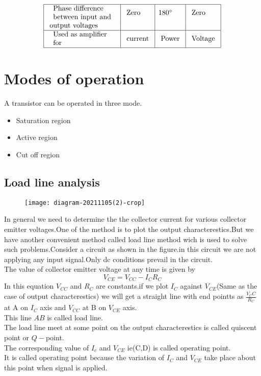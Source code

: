 $$\begin{aligned}
\begin{array}{|l|l|l|l|}
  		\hline \begin{array}{l}
  			\text { Phase difference } \\
  			\text { between input and }
  		\end{array} & \text { Zero } & 180^{\circ} & \text { Zero } \\
  		\text { output voltages } & & & \\
  		\hline \begin{array}{l}
  			\text { Used as amplifier } \\
  			\text { for }
  		\end{array} & \text { current } & \text { Power } & \text { Voltage } \\
  		\hline
  	\end{array}
  \end{aligned}$$
 \section{Modes of operation}
 A transistor can be operated in three mode.
 \begin{itemize}
 	\item Saturation region
 	\item Active region
 	\item Cut off region
 	 \end{itemize}
 	\subsection{Load line analysis}
 	\begin{figure}[H]
 		\centering
 		\texttt{[image: diagram-20211105(2)-crop]}
 		\caption{}
 		\label{}
 	\end{figure}
 	In general we need to determine the the collector current for various collector emitter voltages.One of the method is to plot the output characterestics.But we have another convenient method called load line method wich is used to solve such problems.Consider a circuit as shown in the figure.in this circuit we are not applying any input signal.Only dc conditions prevail in the circuit.\\
 	The value of collector emitter voltage at any time is given by\\
 	$$V_{CE}=V_{CC}-I_CR_C$$
 	In this equation $V_{CC}$ and $R_C$ are constants.if we plot $I_C$ against $V_{CE}$(Same as the case of output characterestics) we will get a straight line with end pointts as $\frac{V_CC}{R_C}$ at A on $I_C$ axis and $V_{CC}$ at B on $V_{CE}$ axis.\\This line $AB$ is called load line.\\
 	The load line meet at some point on the output characterestics is called quiscent point or $Q-$point.\\
 	The corresponding value of $I_c$ and $V_{CE}$ ie(C,D) is called operating point.\\
 	It is called operating point because the variation of $I_C$ and $V_{CE}$ take place about this point when signal is applied.
